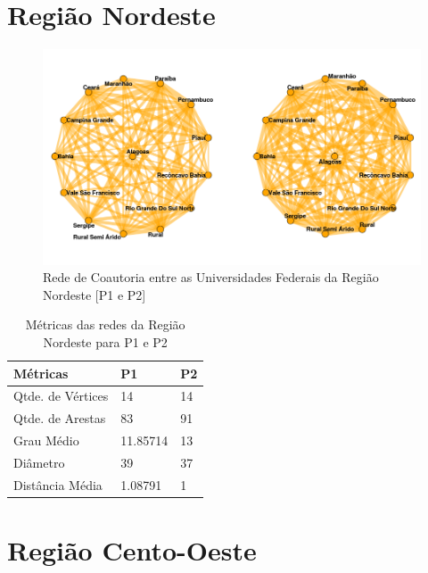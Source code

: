 \documentclass[12pt]{article}
\begin{document}
\section{Região Nordeste}

\begin{figure}[H]
\centering
\includegraphics[scale=0.6]{images/nordeste.png}
\caption{Rede de Coautoria entre as Universidades Federais da Região Nordeste [P1 e P2]}
\label{rede-nordeste}
\end{figure}



\begin{table}[H]
\centering
\begin{tabular}{lll}
\hline
\rowcolor[HTML]{C0C0C0} 
\textbf{Métricas} & \textbf{P1} & \textbf{P2} \\ \hline
Qtde. de Vértices & 14           & 14           \\ \hline
Qtde. de Arestas  & 83           & 91          \\ \hline
Grau Médio        & 11.85714     & 13     \\ \hline
Diâmetro          & 39           & 37           \\ \hline
Distância Média   & 1.08791      & 1     \\ \hline
\end{tabular}
\caption{Métricas das redes da Região Nordeste para P1 e P2}
\end{table}


\section{Região Cento-Oeste}
\end{document}
